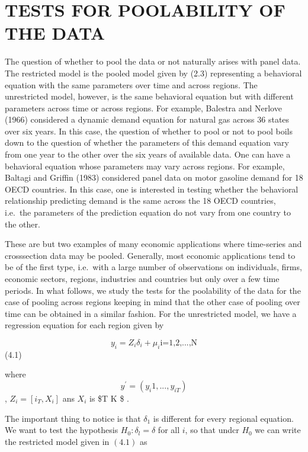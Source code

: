 \documentclass[
]{book}
\begin{document}
\hypertarget{tests-for-poolability-of-the-data}{%
\section{TESTS FOR POOLABILITY OF THE DATA}\label{tests-for-poolability-of-the-data}}

The question of whether to pool the data or not naturally arises with panel data. The restricted model is the pooled model given by (2.3) representing a behavioral equation with the same parameters over time and across regions. The unrestricted model, however, is the same behavioral equation but with different parameters across time or across regions. For example, Balestra and Nerlove (1966) considered a dynamic demand equation for natural gas across 36 states over six years. In this case, the question of whether to pool or not to pool boils down to the question of whether the parameters of this demand equation vary from one year to the other over the six years of available data. One can have a behavioral equation whose parameters may vary across regions. For example, Baltagi and Griffin (1983) considered panel data on motor gasoline demand for 18 OECD countries. In this case, one is interested in testing whether the behavioral relationship predicting demand is the same across the 18 OECD countries, i.e.~the parameters of the prediction equation do not vary from one country to the other.

These are but two examples of many economic applications where time-series and crosssection data may be pooled. Generally, most economic applications tend to be of the first type, i.e.~with a large number of observations on individuals, firms, economic sectors, regions, industries and countries but only over a few time periods. In what follows, we study the tests for the poolability of the data for the case of pooling across regions keeping in mind that the other case of pooling over time can be obtained in a similar fashion.
For the unrestricted model, we have a regression equation for each region given by

\begin{equation}
  y_i=Z_i \delta _i + \mu_i \text{i=1,2,...,N}
\end{equation} (4.1)

where \[ y^{\prime}=(y_i1,...,y_{iT}) \], \(Z_i=[i_T,X_i]\) ans \(X_i\) is \$T \times K \$ .

The important thing to notice is that \(\delta_{1}\) is different for every regional equation. We want to test the hypothesis \(H_{0}: \delta_{l}=\delta\) for all \(i\), so that undcr \(H_{0}\) we can write the restricted model given in \((4.1)\) as
\end{document}
